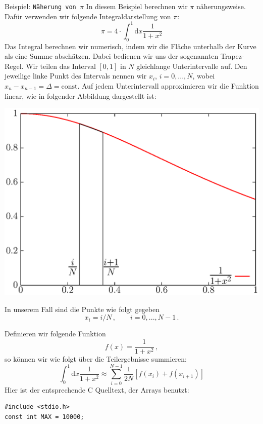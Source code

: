 \begin{myexampleprogram}{Beispiel: \texttt{Näherung von $\pi$}}
  In diesem Beispiel berechnen wir $\pi$ näherungsweise.
  Dafür verwenden wir folgende Integraldarstellung von $\pi$:
  \begin{equation}
    \pi=4\cdot \int_{0}^{1} \mathrm{d}x \dfrac{1}{1+x^2}
  \end{equation}
  Das Integral berechnen wir numerisch, indem wir die Fläche unterhalb der Kurve als eine Summe abschätzen.
  Dabei bedienen wir uns der sogenannten Trapez-Regel.
  Wir teilen das Interval $[0,1]$ in $N$ gleichlange Unterintervalle auf.
  Den jeweilige linke Punkt des Intervals nennen wir $x_i$, $i=0,...,N$, wobei $x_n-x_{n-1}=\Delta=\mathrm{const}$.
  Auf jedem Unterintervall approximieren wir die Funktion linear, wie in folgender Abbildung dargestellt ist:
  \vspace{-5cm}
  \begin{center}
    \includegraphics[width=.8\linewidth]{trapez1.ps}
  \end{center}
  \vspace{-6cm}
  In unserem Fall sind die Punkte wie folgt gegeben
  \begin{displaymath}
    x_i = i/N\,,\qquad i = 0, ..., N-1\,.
  \end{displaymath}


  Definieren wir folgende Funktion
  \[
  f(x) = \frac{1}{1+x^2}\,,
  \]
  so können wir wie folgt über die Teilergebnisse summieren:
  \begin{equation}
    \int_{0}^{1} \mathrm{d}x \dfrac{1}{1+x^2}\approx \sum_{i=0}^{N-1}\frac{1}{2N}[f(x_i)+f(x_{i+1})]
  \end{equation}
  Hier ist der entsprechende C Quelltext, der Arrays benutzt:
\begin{lstlisting}
#include <stdio.h>
const int MAX = 10000;


\end{lstlisting}
\end{myexampleprogram}
